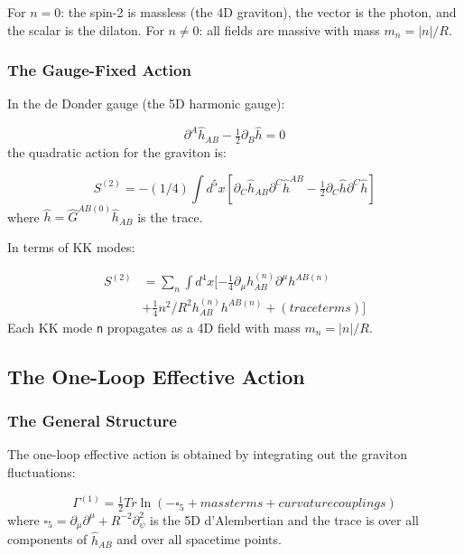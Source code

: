\documentclass[aps,prd,preprint,superscriptaddress,longbibliography,floatfix]{revtex4-2}
\theoremstyle{remark}
\begin{document}
For $n = 0$: the spin-2 is massless (the 4D graviton), the vector is the photon, and the scalar is the dilaton. For $n \neq 0$: all fields are massive with mass $m_n = |n|/R$.


\subsubsection{The Gauge-Fixed Action}

In the de Donder gauge (the 5D harmonic gauge):


\begin{equation}
    \partial^A \hat{h}_{AB} - \tfrac{1}{2} \partial_B \hat{h} = 0
\end{equation}
the quadratic action for the graviton is:


\begin{equation}
    S^{(2)} = -(1/4) \int d^{5}x [\partial_C \hat{h}_{AB} \partial^C \hat{h}^{AB} - \tfrac{1}{2} \partial_C \hat{h} \partial^C \hat{h}]
\end{equation}
where $\hat{h} = \hat{G}^{AB(0)} \hat{h}_{AB}$ is the trace.

In terms of KK modes:


\begin{align}
    S^{(2)} &= \sum_n \int d^{4}x [-\tfrac{1}{4} \partial_\mu h_{AB}^{(n)} \partial^\mu h^{AB(n)} \\
    & + \tfrac{1}{4} n^{2}/R^{2} h_{AB}^{(n)} h^{AB(n)} + (trace terms)]
\end{align}
Each KK mode \texttt{n} propagates as a 4D field with mass $m_n = |n|/R$.



\subsection{The One-Loop Effective Action}


\subsubsection{The General Structure}

The one-loop effective action is obtained by integrating out the graviton fluctuations:


\begin{equation}
    \Gamma^{(1)} = \tfrac{1}{2} Tr \ln(-\square_{5} + mass terms + curvature couplings)
\end{equation}
where $\square_{5} = \partial_\mu\partial^\mu + R^{-2}\partial^{2}_\psi$ is the 5D d'Alembertian and the trace is over all components of $\hat{h}_{AB}$ and over all spacetime points.
\end{document}
